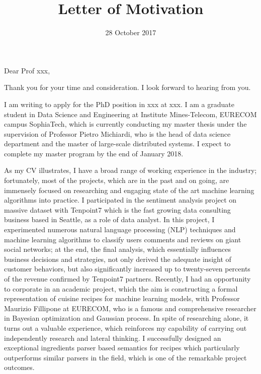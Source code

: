\documentclass[11pt,a4paper,roman]{moderncv}        %
\title{Letter of Motivation}                               %
\begin{document}
\date{28 October 2017}
\opening{Dear Prof xxx,}
\closing{Thank you for your time and consideration.  I look forward to hearing from you.}
\makelettertitle

I am writing to apply for the PhD position in {xxx} at {xxx}. I am a graduate student in Data Science and Engineering at Institute Mines-Telecom, EURECOM campus SophiaTech, which is currently conducting my master thesis under the supervision of Professor Pietro Michiardi, who is the head of data science department and the master of large-scale distributed systems. I expect to complete my master program by the end of January 2018. 

As my CV illustrates, I have a broad range of working experience in the industry; fortunately, most of the projects, which are in the past and on going, are immensely focused on researching and engaging state of the art machine learning algorithms into practice. I participated in the sentiment analysis project on massive dataset with Tenpoint7 which is the fast growing data consulting business based in Seattle, as a role of data analyst. In this project, I experimented numerous natural language processing (NLP) techniques and machine learning algorithms to classify users comments and reviews on giant social networks; at the end, the final analysis, which essentially influences business decisions and strategies, not only derived the adequate insight of customer behaviors, but also significantly increased up to twenty-seven percents of the revenue confirmed by Tenpoint7 partners. Recently, I had an opportunity to corporate in an academic project, which the aim is constructing a formal representation of cuisine recipes for machine learning models, with Professor Maurizio Fillipone at EURECOM, who is a famous and comprehensive researcher in Bayesian optimization and Gaussian process. In spite of researching alone, it turns out a valuable experience, which reinforces my capability of carrying out independently research and lateral thinking. I successfully designed an exceptional ingredients parser based semantics for recipes which particularly outperforms similar parsers in the field, which is one of the remarkable project outcomes.
\end{document}
